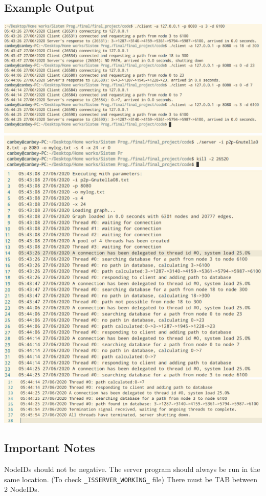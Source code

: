 \documentclass{article}
\begin{document}
\subsection{Example Output}
\begin{center}
    \centering
    \includegraphics[scale=0.5]{img3.png}
    \includegraphics[scale=0.5]{img5.png}
    \includegraphics[scale=0.5]{img4.png}
    \includegraphics[scale=0.5]{img6.png}
    
    \label{fig:myGraph}
\end{center}
\subsection{Important Notes}
NodeIDs should not be negative.
\newline
The server program should always be run in the same location. (To check \texttt{\_ISSERVER\_WORKING\_} file)
\newline
There must be TAB between 2 NodeIDs.
\end{document}
